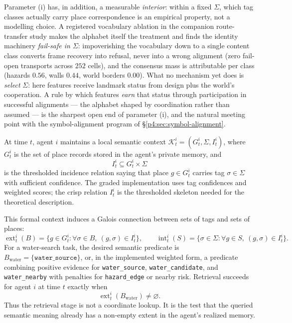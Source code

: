 \documentclass{article}
\begin{document}
Parameter (i) has, in addition, a measurable \emph{interior}: within a
fixed $\Sigma$, which tag classes actually carry place correspondence
is an empirical property, not a modelling choice. A registered
vocabulary ablation in the companion route-transfer study \citep{songlines2} makes the
alphabet itself the treatment and finds the identity machinery
\emph{fail-safe in $\Sigma$}: impoverishing the vocabulary down to a
single content class converts frame recovery into refusal, never into
a wrong alignment (zero fail-open transports across $252$ cells), and
the consensus mass is attributable per class (hazards $0.56$, walls
$0.44$, world borders $0.00$). What no mechanism yet does is
\emph{select} $\Sigma$: here features receive landmark status from
design plus the world's cooperation. A rule by which features
\emph{earn} that status through participation in successful alignments
--- the alphabet shaped by coordination rather than assumed --- is the
sharpest open end of parameter (i), and the natural meeting point with
the symbol-alignment program of \S\ref{p4:sec:symbol-alignment}.

At time $t$, agent $i$ maintains a local semantic context
$\mathcal{K}_t^i=(G_t^i,\Sigma,I_t^i)$, where $G_t^i$ is the set of
place records stored in the agent's private memory, and
\[
I_t^i \subseteq G_t^i \times \Sigma
\]
is the thresholded incidence relation saying that place $g\in G_t^i$
carries tag $\sigma\in\Sigma$ with sufficient confidence. The graded
implementation uses tag confidences and weighted scores; the crisp
relation $I_t^i$ is the thresholded skeleton needed for the theoretical
description.

This formal context induces a Galois connection between sets of tags
and sets of places:
\[
\operatorname{ext}_t^i(B)=\{g\in G_t^i:\forall\sigma\in B,\ (g,\sigma)\in I_t^i\},
\qquad
\operatorname{int}_t^i(S)=\{\sigma\in\Sigma:\forall g\in S,\ (g,\sigma)\in I_t^i\}.
\]
For a water-search task, the desired semantic predicate is
$B_{\mathrm{water}}=\{\texttt{water\_source}\}$, or, in the implemented
weighted form, a predicate combining positive evidence for
\texttt{water\_source}, \texttt{water\_candidate}, and
\texttt{water\_nearby} with penalties for \texttt{hazard\_edge} or
nearby risk. Retrieval succeeds for agent $i$ at time $t$ exactly when
\[
\operatorname{ext}_t^i(B_{\mathrm{water}})\neq\varnothing .
\]
Thus the retrieval stage is not a coordinate lookup. It is the test
that the queried semantic meaning already has a non-empty extent in the
agent's realized memory.
\end{document}
